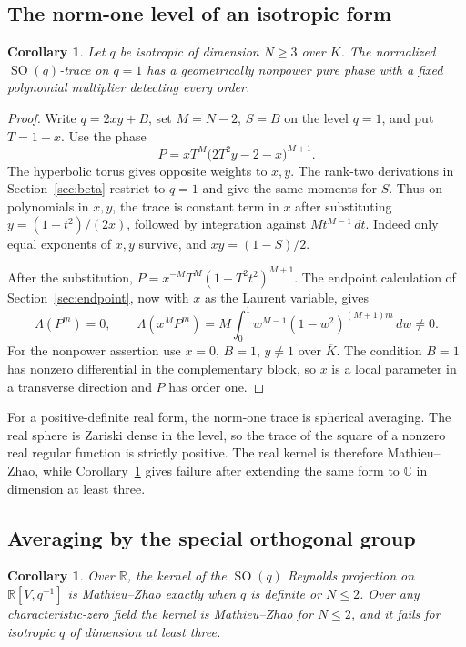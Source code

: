\documentclass[11pt]{article}
\newtheorem{corollary}[theorem]{Corollary}
\DeclareMathOperator{\SO}{SO}
\begin{document}
\subsection*{The norm-one level of an isotropic form}

\begin{corollary}\label{cor:norm-one}
Let \(q\) be isotropic of dimension \(N\ge3\) over \(K\). The
normalized \(\SO(q)\)-trace on \(q=1\) has a geometrically nonpower
pure phase with a fixed polynomial multiplier detecting every order.
\end{corollary}

\begin{proof}
Write \(q=2xy+B\), set \(M=N-2\), \(S=B\) on the level \(q=1\),
and put \(T=1+x\). Use the phase
\[
             P=xT^M\bigl(2T^2 y-2-x\bigr)^{M+1}.
\]
The hyperbolic torus gives opposite weights to \(x,y\). The
rank-two derivations in Section~\ref{sec:beta} restrict to \(q=1\)
and give the same moments for \(S\). Thus on polynomials in
\(x,y\), the trace is constant term in \(x\) after substituting
\(y=(1-t^2)/(2x)\), followed by integration against
\(M t^{M-1}\,dt\). Indeed only equal exponents of \(x,y\)
survive, and \(xy=(1-S)/2\).

After the substitution, \(P=x^{-M}T^M(1-T^2t^2)^{M+1}\).
The endpoint calculation of Section~\ref{sec:endpoint}, now with
\(x\) as the Laurent variable, gives
\[
  \Lambda(P^m)=0,\qquad
  \Lambda(x^M P^m)
     =M\int_0^1 w^{M-1}(1-w^2)^{(M+1)m}\,dw\ne0 .
\]
For the nonpower assertion use \(x=0\), \(B=1\), \(y\ne1\)
over \(\overline K\). The condition \(B=1\) has nonzero differential
in the complementary block, so \(x\) is a local parameter in
a transverse direction and \(P\) has order one.
\end{proof}

For a positive-definite real form, the norm-one trace is spherical
averaging. The real sphere is Zariski dense in the level, so the
trace of the square of a nonzero real regular function is
strictly positive. The real kernel is therefore Mathieu--Zhao,
while Corollary~\ref{cor:norm-one} gives failure after extending
the same form to \(\mathbb C\) in dimension at least three.

\subsection*{Averaging by the special orthogonal group}

\begin{corollary}\label{cor:rotations-only}
Over \(\mathbb R\), the kernel of the \(\SO(q)\) Reynolds projection
on \(\mathbb R[V,q^{-1}]\) is Mathieu--Zhao exactly when \(q\) is
definite or \(N\le2\). Over any characteristic-zero field the kernel
is Mathieu--Zhao for \(N\le2\), and it fails for isotropic \(q\) of
dimension at least three.
\end{corollary}
\end{document}
